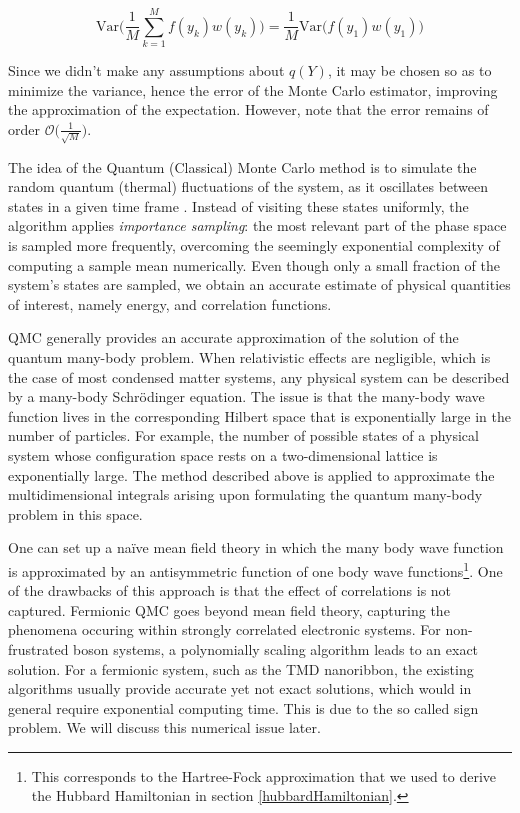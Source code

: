 \documentclass[10pt, twocolumn, twoside]{article}
\begin{document}
\begin{equation}
\text{Var}\bigg( \frac{1}{M} \sum_{k=1}^M f(y_k) w(y_k) \bigg) = \frac{1}{M} \text{Var}\bigg( f(y_1) w(y_1) \bigg)
\end{equation}

Since we didn't make any assumptions about $q(Y)$, it may be chosen so as to minimize the variance, hence the error of the Monte Carlo estimator, improving the approximation of the expectation. However, note that the error remains of order $\mathcal{O}\big(\frac{1}{\sqrt{M}}\big)$.

The idea of the Quantum (Classical) Monte Carlo method is to simulate the random quantum (thermal) fluctuations of the system, as it oscillates between states in a given time frame \cite{newman_barkema}. Instead of visiting these states uniformly, the algorithm applies \emph{importance sampling}: the most relevant part of the phase space is sampled more frequently, overcoming the seemingly exponential complexity of computing a sample mean numerically. Even though only a small fraction of the system's states are sampled, we obtain an accurate estimate of physical quantities of interest, namely energy, and correlation functions.

QMC generally provides an accurate approximation of the solution of the quantum many-body problem. When relativistic effects are negligible, which is the case of most condensed matter systems, any physical system can be described by a many-body Schr\"odinger equation. The issue is that the many-body wave function lives in the corresponding Hilbert space that is  exponentially large in the number of particles. For example, the number of possible states of a physical system whose configuration space rests on a two-dimensional lattice is exponentially large. The method described above is applied to approximate the multidimensional integrals arising upon formulating the quantum many-body problem in this space.

One can set up a na\"ive mean field theory in which the many body wave function is approximated by an antisymmetric function of one body wave functions\footnote{This corresponds to the Hartree-Fock approximation that we used to derive the Hubbard Hamiltonian in section \ref{hubbardHamiltonian}.}. One of the drawbacks of this approach is that the effect of  correlations is not captured. Fermionic QMC goes beyond mean field theory,  capturing the phenomena occuring within strongly correlated electronic systems. For non-frustrated boson systems, a polynomially scaling algorithm leads to an exact solution. For a fermionic system, such as the TMD nanoribbon, the existing algorithms usually provide accurate yet not exact solutions, which would in general require exponential computing time. This is due to the so called sign problem. We will discuss this numerical issue later. 
\end{document}
